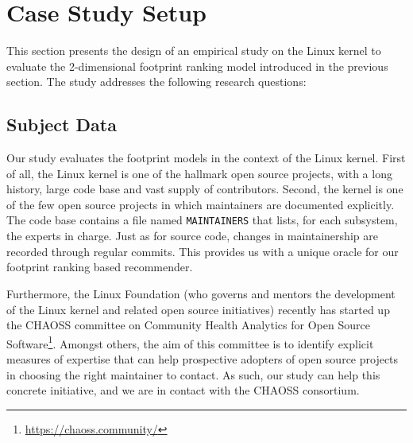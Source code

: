 







\section{Case Study Setup}
\label{sec:case-study-setup}

This section presents the design of an empirical study on the Linux kernel to evaluate the 2-dimensional footprint ranking model introduced in the previous section. The study addresses the following research questions:


\subsection{Subject Data}
\label{sec:subject-data}

Our study evaluates the footprint models in the context of the Linux kernel. First of all, the Linux kernel is one of the hallmark open source projects, with a long history, large code base and vast supply of contributors. Second, the kernel is one of the few open source projects in which maintainers are documented explicitly. The code base contains a file named \texttt{MAINTAINERS} that lists, for each subsystem, the experts in charge. Just as for source code, changes in maintainership are recorded through regular commits. This provides us with a unique oracle for our footprint ranking based recommender.

Furthermore, the Linux Foundation (who governs and mentors the development of the Linux kernel and related open source initiatives) recently has started up the CHAOSS committee on Community Health Analytics for Open Source Software\footnote{\url{https://chaoss.community/}}. Amongst others, the aim of this committee is to identify explicit measures of expertise that can help prospective adopters of open source projects in choosing the right maintainer to contact. As such, our study can help this concrete initiative, and we are in contact with the CHAOSS consortium.%

